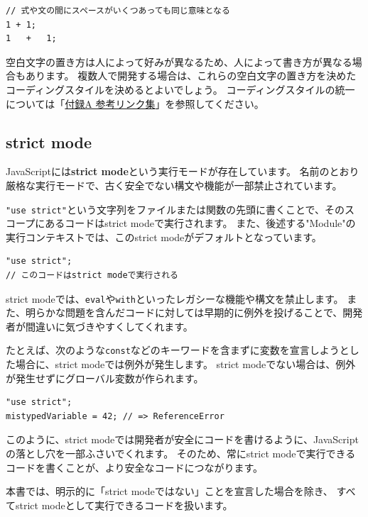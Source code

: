 \begin{lstlisting}
// 式や文の間にスペースがいくつあっても同じ意味となる
1 + 1;
1   +   1;
\end{lstlisting}

空白文字の置き方は人によって好みが異なるため、人によって書き方が異なる場合もあります。
複数人で開発する場合は、これらの空白文字の置き方を決めたコーディングスタイルを決めるとよいでしょう。
コーディングスタイルの統一については「\hyperlink{reference-links}{付録A 参考リンク集}」を参照してください。

\hypertarget{strict-mode}{%
\subsection{strict mode}\label{strict-mode}}

JavaScriptには\textbf{strict mode}という実行モードが存在しています。
名前のとおり厳格な実行モードで、古く安全でない構文や機能が一部禁止されています。

\texttt{"use strict"}という文字列をファイルまたは関数の先頭に書くことで、そのスコープにあるコードはstrict modeで実行されます。
また、後述する"Module"の実行コンテキストでは、このstrict modeがデフォルトとなっています。\enlargethispage{\baselineskip}

\begin{lstlisting}
"use strict";
// このコードはstrict modeで実行される
\end{lstlisting}

strict modeでは、\texttt{eval}や\texttt{with}といったレガシーな機能や構文を禁止します。
また、明らかな問題を含んだコードに対しては早期的に例外を投げることで、開発者が間違いに気づきやすくしてくれます。

たとえば、次のような\texttt{const}などのキーワードを含まずに変数を宣言しようとした場合に、strict modeでは例外が発生します。
strict modeでない場合は、例外が発生せずにグローバル変数が作られます。

\begin{lstlisting}
"use strict";
mistypedVariable = 42; // => ReferenceError
\end{lstlisting}

このように、strict modeでは開発者が安全にコードを書けるように、JavaScriptの落とし穴を一部ふさいでくれます。
そのため、常にstrict modeで実行できるコードを書くことが、より安全なコードにつながります。

本書では、明示的に「strict modeではない」ことを宣言した場合を除き、
すべてstrict modeとして実行できるコードを扱います。

